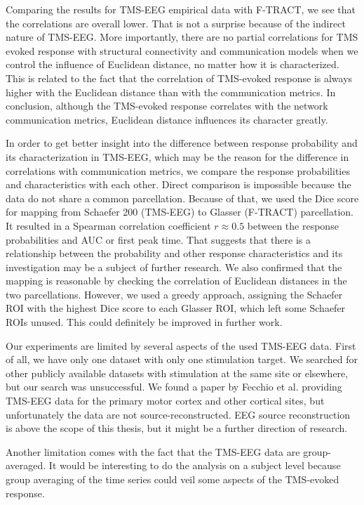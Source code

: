 Comparing the results for TMS-EEG empirical data with F-TRACT, we see that the correlations are overall lower. That is not a surprise because of the indirect nature of TMS-EEG. More importantly, there are no partial correlations for TMS evoked response with structural connectivity and communication models when we control the influence of Euclidean distance, no matter how it is characterized. This is related to the fact that the correlation of TMS-evoked response is always higher with the Euclidean distance than with the communication metrics. In conclusion, although the TMS-evoked response correlates with the network communication metrics, Euclidean distance influences its character greatly.

In order to get better insight into the difference between response probability and its characterization in TMS-EEG, which may be the reason for the difference in correlations with communication metrics, we compare the response probabilities and characteristics with each other. Direct comparison is impossible because the data do not share a common parcellation. Because of that, we used the Dice score for mapping from Schaefer 200 (TMS-EEG) to Glasser (F-TRACT) parcellation. It resulted in a Spearman correlation coefficient $r\approx0.5$ between the response probabilities and AUC or first peak time. That suggests that there is a relationship between the probability and other response characteristics and its investigation may be a subject of further research. We also confirmed that the mapping is reasonable by checking the correlation of Euclidean distances in the two parcellations. However, we used a greedy approach, assigning the Schaefer ROI with the highest Dice score to each Glasser ROI, which left some Schaefer ROIs unused. This could definitely be improved in further work.

Our experiments are limited by several aspects of the used TMS-EEG data. First of all, we have only one dataset with only one stimulation target. We searched for other publicly available datasets with stimulation at the same site or elsewhere, but our search was unsuccessful. We found a paper by Fecchio et al. \cite{fecchio_spectral_2017} providing TMS-EEG data for the primary motor cortex and other cortical sites, but unfortunately the data are not source-reconstructed. EEG source reconstruction is above the scope of this thesis, but it might be a further direction of research.

Another limitation comes with the fact that the TMS-EEG data are group-averaged. It would be interesting to do the analysis on a subject level because group averaging of the time series could veil some aspects of the TMS-evoked response.

